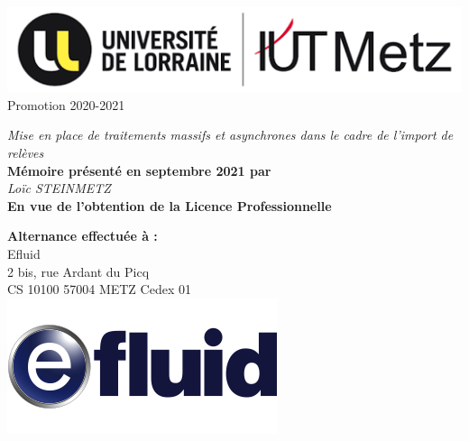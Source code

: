 \documentclass[a4paper, 12pt]{report}
\begin{document}
\clearpage
\thispagestyle{empty}
\null
\clearpage

\thispagestyle{empty}
\begin{center}  
\begin{multicols}{2}
  \flushleft
  \null
  \includegraphics[width=\columnwidth]{../res/logo-iut.png}
  \flushright
  \null
  \vspace{0.3cm}
  \large{Promotion 2020-2021}
\end{multicols}
\vspace{2cm}
\LARGE{\textit{Mise en place de traitements massifs et asynchrones dans le cadre de l'import de relèves}}\\
\vspace{2cm}
\large{\textbf{Mémoire présenté en septembre 2021 par}}\\
\vspace{0.5cm}
\Large{\textit{Loïc STEINMETZ}}\\
\vspace{2cm}
\large{\textbf{En vue de l'obtention de la Licence Professionnelle}}\\
\vspace{0.5cm}
\vspace{2.8cm}
\begin{multicols}{2}
  \flushleft
  \null
  \textbf{Alternance effectuée à :}\\
  Efluid\\
  2 bis, rue Ardant du Picq\\
  CS 10100 57004 METZ Cedex 01\\
  \flushright
  \null
  \includegraphics[width=.6\columnwidth]{../res/logo-efluid.jpg}
\end{multicols}
\end{center}
\end{document}

